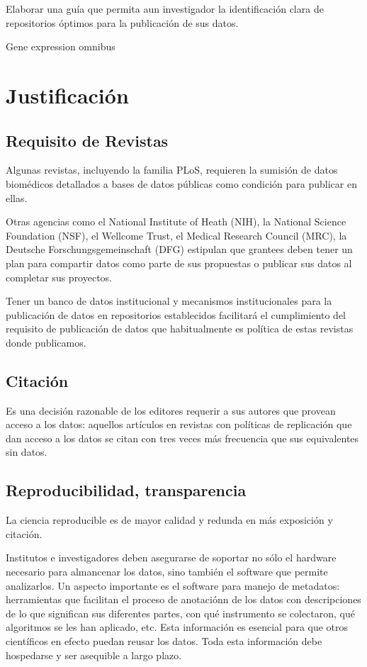 \documentclass[
10pt, %
letterpaper, %
oneside, %
headinclude,footinclude, %
BCOR5mm, %
]{scrartcl}
\begin{document}
Elaborar una guía que permita aun investigador la identificación clara
de repositorios óptimos para la publicación de sus datos.
\cite{_genebank_????}
\cite{king_introduction_2007}

Gene expression omnibus

\section{Justificación}


\subsection{Requisito de Revistas}

Algunas revistas, incluyendo la familia PLoS, requieren la sumisión de
datos biomédicos detallados a bases de datos públicas como condición
para publicar en ellas.\cite{piwowar_sharing_2007, hrynaszkiewicz}

Otras agencias como el National Institute of Heath (NIH), la National
Science Foundation (NSF), el Wellcome Trust, el Medical Research
Council (MRC), la Deutsche Forschungsgemeinschaft (DFG) estipulan que
grantees deben tener un plan para compartir datos como parte de sus
propuestas o publicar sus datos al completar sus
proyectos.\cite{wicherts_publish_2012}

Tener un banco de datos institucional y mecanismos institucionales
para la publicación de datos en repositorios establecidos facilitará
el cumplimiento del requisito de publicación de datos que
habitualmente es política de estas revistas donde publicamos.


\subsection{Citación}
Es una decisión razonable de los editores requerir a sus autores
que provean acceso a los datos: aquellos artículos en revistas con
políticas de replicación que dan acceso a los datos se citan con tres
veces más frecuencia que sus equivalentes sin datos.\cite{walport_sharing_2011}


\subsection{Reproducibilidad, transparencia}
La ciencia reproducible es de mayor calidad y redunda en más exposición y
citación. \cite{piwowar_sharing_2007, ioannidis_improving_2011}

Institutos e investigadores deben asegurarse de soportar no sólo el
hardware necesario para almancenar los datos, sino también el software
que permite analizarlos. Un aspecto importante es el software para
manejo de metadatos: herramientas que facilitan el proceso de
anotaciónn de los datos con descripciones de lo que significan sus
diferentes partes, con qué instrumento se colectaron, qué algoritmos
se les han aplicado, etc. Esta información es esencial para que otros
científicos en efecto puedan reusar los datos. Toda esta información
debe hospedarse y ser asequible a largo plazo.\cite{said_datas_2009}
\end{document}
